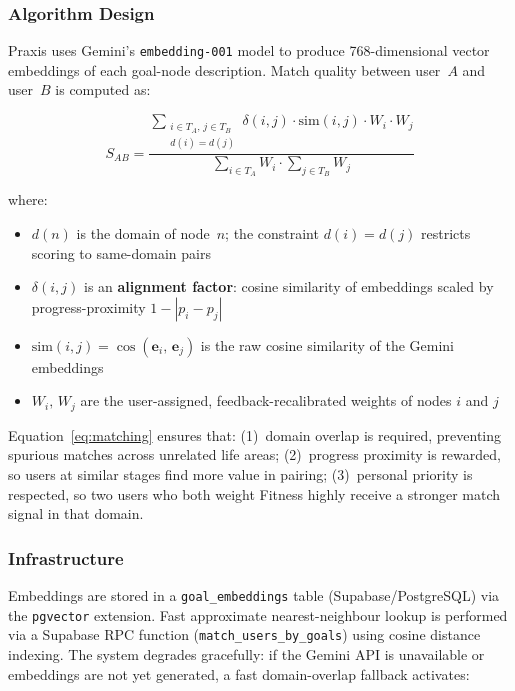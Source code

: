 \documentclass[11pt,a4paper]{article}
\begin{document}
\subsubsection{Algorithm Design}

Praxis uses Gemini's \texttt{embedding-001} model to produce 768-dimensional vector embeddings of each goal-node description. Match quality between user~$A$ and user~$B$ is computed as:

\begin{equation}
S_{AB} = \frac{\displaystyle\sum_{\substack{i \in T_A,\, j \in T_B \\ d(i) = d(j)}} \delta(i,j) \cdot \mathrm{sim}(i,j) \cdot W_i \cdot W_j}{\displaystyle\sum_{i \in T_A} W_i \cdot \sum_{j \in T_B} W_j}
\label{eq:matching}
\end{equation}

where:
\begin{itemize}
  \item $d(n)$ is the domain of node~$n$; the constraint $d(i)=d(j)$ restricts scoring to same-domain pairs
  \item $\delta(i,j)$ is an \textbf{alignment factor}: cosine similarity of embeddings scaled by progress-proximity $1 - |p_i - p_j|$
  \item $\mathrm{sim}(i,j) = \cos(\mathbf{e}_i,\, \mathbf{e}_j)$ is the raw cosine similarity of the Gemini embeddings
  \item $W_i,\, W_j$ are the user-assigned, feedback-recalibrated weights of nodes $i$ and $j$
\end{itemize}

Equation~\eqref{eq:matching} ensures that: (1)~domain overlap is required, preventing spurious matches across unrelated life areas; (2)~progress proximity is rewarded, so users at similar stages find more value in pairing; (3)~personal priority is respected, so two users who both weight Fitness highly receive a stronger match signal in that domain.

\subsubsection{Infrastructure}

Embeddings are stored in a \texttt{goal\_embeddings} table (Supabase/PostgreSQL) via the \texttt{pgvector} extension. Fast approximate nearest-neighbour lookup is performed via a Supabase RPC function (\texttt{match\_users\_by\_goals}) using cosine distance indexing. The system degrades gracefully: if the Gemini API is unavailable or embeddings are not yet generated, a fast domain-overlap fallback activates:
\end{document}
